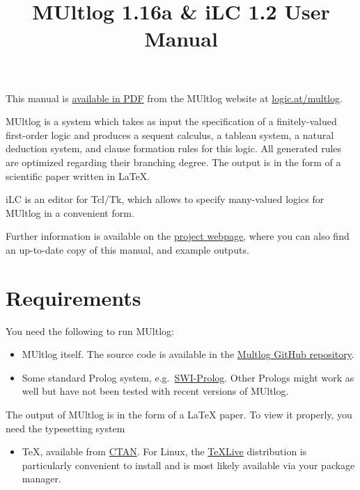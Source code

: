 \documentclass[
]{article}
\title{MUltlog 1.16a \& iLC 1.2 User Manual}
\author{}
\date{}
\providecommand{\tightlist}{%
  \setlength{\itemsep}{0pt}\setlength{\parskip}{0pt}}
\begin{document}
\maketitle

{
\setcounter{tocdepth}{2}
\tableofcontents
}
This manual is \href{https://logic.at/multlog/multlog.pdf}{available in
PDF} from the MUltlog website at
\href{https://logic.at/multlog}{logic.at/multlog}.

MUltlog is a system which takes as input the specification of a
finitely-valued first-order logic and produces a sequent calculus, a
tableau system, a natural deduction system, and clause formation rules
for this logic. All generated rules are optimized regarding their
branching degree. The output is in the form of a scientific paper
written in LaTeX.

iLC is an editor for Tcl/Tk, which allows to specify many-valued logics
for MUltlog in a convenient form.

Further information is available on the
\href{http://www.logic.at/multlog/}{project webpage}, where you can also
find an up-to-date copy of this manual, and example outputs.

\hypertarget{requirements}{%
\section{Requirements}\label{requirements}}

You need the following to run MUltlog:

\begin{itemize}
\item
  MUltlog itself. The source code is available in the
  \href{https://github.com/rzach/multlog}{Multlog GitHub repository}.
\item
  Some standard Prolog system,
  e.g.~\href{https://www.swi-prolog.org/}{SWI-Prolog}. Other Prologs
  might work as well but have not been tested with recent versions of
  MUltlog.
\end{itemize}

The output of MUltlog is in the form of a LaTeX paper. To view it
properly, you need the typesetting system

\begin{itemize}
\tightlist
\item
  TeX, available from \href{https://ctan.org/}{CTAN}. For Linux, the
  \href{https://www.tug.org/texlive/}{TeXLive} distribution is
  particularly convenient to install and is most likely available via
  your package manager.
\end{itemize}
\end{document}
